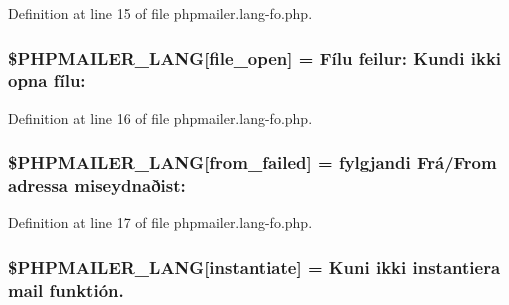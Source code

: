 Definition at line 15 of file phpmailer.\+lang-\/fo.\+php.

\subsubsection[{\texorpdfstring{\$\+P\+H\+P\+M\+A\+I\+L\+E\+R\+\_\+\+L\+A\+NG}{$PHPMAILER_LANG}}]{\setlength{\rightskip}{0pt plus 5cm}\$P\+H\+P\+M\+A\+I\+L\+E\+R\+\_\+\+L\+A\+NG\mbox{[}\textquotesingle{}file\+\_\+open\textquotesingle{}\mbox{]} = \textquotesingle{}Fílu feilur\+: Kundi ikki opna fílu\+: \textquotesingle{}}\hypertarget{phpmailer_8lang-fo_8php_a28d1a6517bf4c942a0ddd506188ad2e0}{}\label{phpmailer_8lang-fo_8php_a28d1a6517bf4c942a0ddd506188ad2e0}


Definition at line 16 of file phpmailer.\+lang-\/fo.\+php.

\subsubsection[{\texorpdfstring{\$\+P\+H\+P\+M\+A\+I\+L\+E\+R\+\_\+\+L\+A\+NG}{$PHPMAILER_LANG}}]{\setlength{\rightskip}{0pt plus 5cm}\$P\+H\+P\+M\+A\+I\+L\+E\+R\+\_\+\+L\+A\+NG\mbox{[}\textquotesingle{}from\+\_\+failed\textquotesingle{}\mbox{]} = \textquotesingle{}fylgjandi Frá/From adressa miseydnaðist\+: \textquotesingle{}}\hypertarget{phpmailer_8lang-fo_8php_adf832ae12155a09be077c6d5e4fd7e22}{}\label{phpmailer_8lang-fo_8php_adf832ae12155a09be077c6d5e4fd7e22}


Definition at line 17 of file phpmailer.\+lang-\/fo.\+php.

\subsubsection[{\texorpdfstring{\$\+P\+H\+P\+M\+A\+I\+L\+E\+R\+\_\+\+L\+A\+NG}{$PHPMAILER_LANG}}]{\setlength{\rightskip}{0pt plus 5cm}\$P\+H\+P\+M\+A\+I\+L\+E\+R\+\_\+\+L\+A\+NG\mbox{[}\textquotesingle{}instantiate\textquotesingle{}\mbox{]} = \textquotesingle{}Kuni ikki instantiera mail funktión.\textquotesingle{}}\hypertarget{phpmailer_8lang-fo_8php_ad58dde16780f4770ccf4dd282ea1f5ad}{}\label{phpmailer_8lang-fo_8php_ad58dde16780f4770ccf4dd282ea1f5ad}


